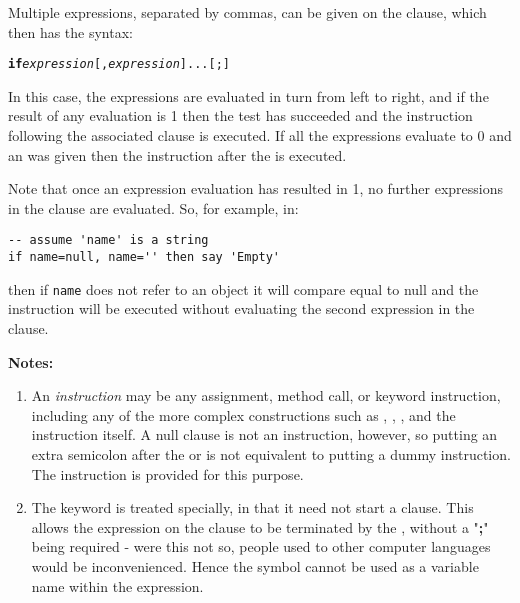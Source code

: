 Multiple expressions, separated by commas, can be given on the
 clause, which then has the syntax:
\begin{shaded}
\begin{alltt}
\textbf{if} \emph{expression}[, \emph{expression}]... [;]
\end{alltt}
\end{shaded}
In this case, the expressions are evaluated in turn from left to
right, and if the result of any evaluation is 1 then the test has
succeeded and the instruction following the associated 
clause is executed.
If all the expressions evaluate to 0 and an  was given
then the instruction after the  is executed.
 
Note that once an expression evaluation has resulted in 1, no further
expressions in the clause are evaluated.  So, for example, in:
\begin{lstlisting}
-- assume 'name' is a string
if name=null, name='' then say 'Empty'
\end{lstlisting}
then if \texttt{name} does not refer to an object it will compare equal to
null and the  instruction will be executed without
evaluating the second expression in the  clause.
\begin{shaded}\noindent
\textbf{Notes:}
\begin{enumerate}
\item An \emph{instruction} may be any assignment, method call, or
keyword instruction, including any of the more complex constructions
such as , , , and the 
instruction itself.
A null clause is not an instruction, however, so putting an extra
semicolon after the  or  is not equivalent to
putting a dummy instruction.
The  instruction is provided for this purpose.
\item The keyword  is treated specially, in that it need not start a
clause.
This allows the expression on the  clause to be terminated by
the , without a "\textbf{;}" being required -
were this not so, people used to other computer languages would
be inconvenienced.
Hence the symbol  cannot be used as a variable name within
the expression.
\end{enumerate}
\end{shaded}\indent
